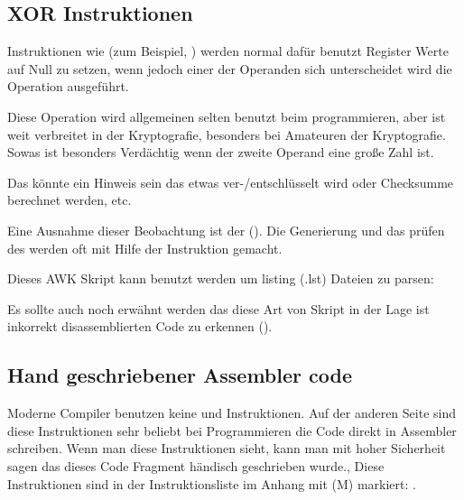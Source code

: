 
\subsection{XOR Instruktionen}

Instruktionen wie  (zum Beispiel, )
werden normal daf\"ur benutzt Register Werte auf Null zu setzen, wenn jedoch
einer der Operanden sich unterscheidet wird die  Operation 
ausgef\"uhrt.

Diese Operation wird allgemeinen selten benutzt beim programmieren, aber ist
weit verbreitet in der Kryptografie, besonders bei Amateuren der Kryptografie.
Sowas ist besonders Verd\"achtig wenn der zweite Operand eine große Zahl ist.

Das k\"onnte ein Hinweis sein das etwas ver-/entschl\"usselt wird oder Checksumme berechnet werden, etc.

Eine Ausnahme dieser Beobachtung ist der  (). 
Die Generierung und das pr\"ufen des  werden oft mit Hilfe der \XOR Instruktion gemacht. 


Dieses AWK Skript kann benutzt werden um \IDA{} listing (.lst) Dateien zu parsen:



Es sollte auch noch erw\"ahnt werden das diese Art von Skript in der Lage ist inkorrekt disassemblierten Code zu erkennen
().

\subsection{Hand geschriebener Assembler code}


Moderne Compiler benutzen keine  und  Instruktionen.
Auf der anderen Seite sind diese Instruktionen sehr beliebt bei Programmieren die Code direkt in Assembler schreiben.
Wenn man diese Instruktionen sieht, kann man mit hoher Sicherheit sagen das dieses Code Fragment h\"andisch geschrieben wurde.,
Diese Instruktionen sind in der Instruktionsliste im Anhang mit (M) markiert: .

